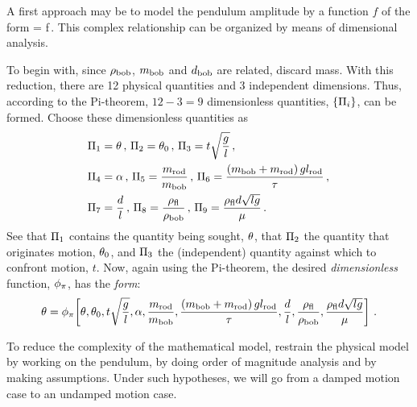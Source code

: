 A first approach may be to model the pendulum amplitude by a function $f$ of the form
\beq
\angpos = f\,.
\eeq
This complex relationship can be organized by means of dimensional analysis. 

To begin with, since $\rho_\text{bob}$, $m_\text{bob}$ and $d_\text{bob}$ are related, discard mass. With this reduction, there are 12 physical quantities and 3 independent dimensions. Thus, according to the Pi-theorem, $12 - 3 = 9$ dimensionless quantities, $\left\lbrace{\Pi_i}\right\rbrace$, can be formed. Choose these dimensionless quantities as
\begin{align*}
&\Pi_1 = \theta\,,\,
 \Pi_2 = \theta_0\,,\,
 \Pi_3 = t\sqrt{\dfrac{g}{l}}\,,\,\\
&\Pi_4 = \alpha\,,\,
 \Pi_5 = \dfrac{m_\text{rod}}{m_\text{bob}}\,,\,
 \Pi_6 = \dfrac{\left(m_\text{bob} + m_\text{rod}\right)gl_\text{rod}}{\tau}\,,\,\\
&\Pi_7 = \dfrac{d}{l}\,,\,
 \Pi_8 = \dfrac{\rho_\text{fl}}{\rho_\text{bob}}\,,\,
 \Pi_9 = \dfrac{\rho_\text{fl}d\sqrt{lg}}{\mu}\,.
\end{align*}
See that $\Pi_1$ contains the quantity being sought, $\theta$, that $\Pi_2$ the quantity that originates motion, $\theta_0$, and $\Pi_3$ the (independent) quantity against which to confront motion, $t$. Now, again using the Pi-theorem, the desired \emph{dimensionless} function, $\phi_{\pi}$, has the \emph{form}:
\begin{equation}\label{eq:fullgravpendulummodel}
\theta = \phi_{\pi}\!\left[{
            \theta,
            \theta_0,
            t\sqrt{\dfrac{g}{l}},
            \alpha,
            \dfrac{m_\text{rod}}{m_\text{bob}},
            \dfrac{\left(m_\text{bob} + m_\text{rod}\right)gl_\text{rod}}{\tau},
            \dfrac{d}{l},
            \dfrac{\rho_\text{fl}}{\rho_\text{bob}},
            \dfrac{\rho_\text{fl}d\sqrt{lg}}{\mu}
            }\right]\,.
\end{equation}

To reduce the complexity of the mathematical model, restrain the physical model by working on the pendulum, by doing order of magnitude analysis and by making assumptions. Under such hypotheses, we will go from a damped motion case to an undamped motion case.


